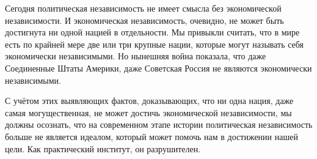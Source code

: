 Сегодня политическая независимость не имеет смысла без экономической независимости. И экономическая независимость, очевидно, не может быть достигнута ни одной нацией в отдельности. Мы привыкли считать, что в мире есть по крайней мере две или три крупные нации, которые могут называть себя экономически независимыми. Но нынешняя война показала, что даже Соединенные Штаты Америки, даже Советская Россия не являются экономически независимыми.

С учётом этих выявляющих фактов, доказывающих, что ни одна нация, даже самая могущественная, не может достичь экономической независимости, мы должны осознать, что на современном этапе истории политическая независимость больше не является идеалом, который может помочь нам в достижении нашей цели. Как практический институт, он разрушителен.
